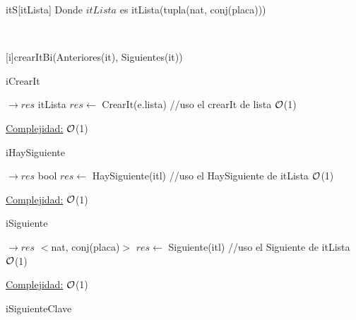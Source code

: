 \begin{Representacion}
	
	
	\begin{Estructura}{itS}[itLista]
		Donde $itLista$ es itLista(tupla(nat, conj(placa)))
	\end{Estructura}
	
	
	~
	~
	
	
	{crearItBi(Anteriores(it), Siguientes(it))}

\begin{Algoritmos}
	
	\begin{algorithm}[H]
		\caption{iCrearIt}
		
		\begin{algorithmic}[1]
			 $\to res$ itLista
			\State $res \leftarrow$ CrearIt(e.lista) //uso el crearIt de lista \Comment $\mathcal{O}$(1)
			\EndProcedure 
		\end{algorithmic}
		\underline{Complejidad:} $\mathcal{O}$(1)
	\end{algorithm}
	
	\begin{algorithm}[H]
		\caption{iHaySiguiente}
		
		\begin{algorithmic}[1]
			 $\to res$ bool
			\State $res \leftarrow$ HaySiguiente(itl) //uso el HaySiguiente de itLista \Comment $\mathcal{O}$(1)
			\EndProcedure 
		\end{algorithmic}
		\underline{Complejidad:} $\mathcal{O}$(1)
	\end{algorithm}
	
	\begin{algorithm}[H]
		\caption{iSiguiente}
		
		\begin{algorithmic}[1]
			 $\to res$ $<$nat, conj(placa)$>$
			\State $res \leftarrow$ Siguiente(itl) //uso el Siguiente de itLista \Comment $\mathcal{O}$(1)
			\EndProcedure 
		\end{algorithmic}
		\underline{Complejidad:} $\mathcal{O}$(1)
	\end{algorithm}
	
	\begin{algorithm}[H]
		\caption{iSiguienteClave}
		

\end{algorithm}
\end{Algoritmos}
\end{Representacion}
